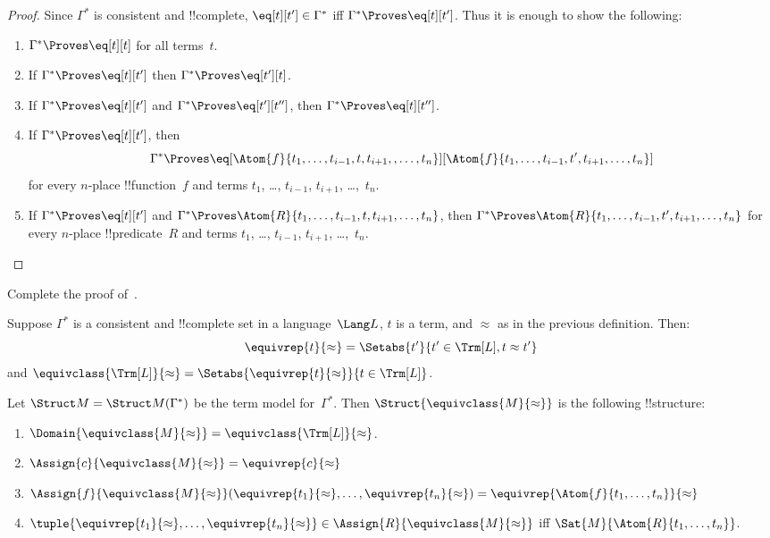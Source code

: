 \documentclass[../../../include/open-logic-section]{subfiles}
\begin{document}
\begin{proof}
Since $\Gamma^*$ is consistent and !!{complete}, $\eq[t][t'] \in
\Gamma^*$ iff $\Gamma^* \Proves \eq[t][t']$.  Thus it is enough to
show the following:
\begin{enumerate}
\item $\Gamma^* \Proves \eq[t][t]$ for all terms~$t$.
\item If $\Gamma^* \Proves \eq[t][t']$ then $\Gamma^* \Proves \eq[t'][t]$.
\item If $\Gamma^* \Proves \eq[t][t']$ and $\Gamma^* \Proves
  \eq[t'][t'']$, then $\Gamma^* \Proves \eq[t][t'']$.
\item If $\Gamma^* \Proves \eq[t][t']$, then
\[
\Gamma^* \Proves
\eq[\Atom{f}{t_1,\dots,t_{i-1},t,t_{i+1},,\dots,t_n}][\Atom{f}{t_1,\dots,t_{i-1},t',t_{i+1},\dots,t_n}]
\]
for every $n$-place !!{function}~$f$ and terms $t_1$, \dots,
$t_{i-1}$, $t_{i+1}$, \dots,~$t_n$.
\item If $\Gamma^* \Proves \eq[t][t']$ and
$\Gamma^* \Proves
\Atom{R}{t_1,\dots,t_{i-1},t,t_{i+1},\dots,t_n}$, then
$\Gamma^* \Proves \Atom{R}{t_1,\dots,t_{i-1},t',t_{i+1},\dots,t_n}$
for every $n$-place !!{predicate}~$R$ and terms $t_1$, \dots,
$t_{i-1}$, $t_{i+1}$, \dots,~$t_n$.
\end{enumerate}
\end{proof}

\begin{prob}
Complete the proof of~.
\end{prob}

\begin{defn}
Suppose $\Gamma^*$ is a consistent and !!{complete} set in a
language~$\Lang L$, $t$ is a term, and $\approx$ as in the previous
definition.  Then:
\[
\equivrep{t}{\approx} = \Setabs{t'}{t'\in \Trm[L], t \approx t'}
\]
and $\equivclass{\Trm[L]}{\approx} = \Setabs{\equivrep{t}{\approx}}{t \in \Trm[L]}$.
\end{defn}

\begin{defn}
Let $\Struct M = \Struct M(\Gamma^*)$ be the term model
for~$\Gamma^*$.  Then $\Struct{\equivclass{M}{\approx}}$ is the following
!!{structure}:
\begin{enumerate}
\item $\Domain{\equivclass{M}{\approx}} = \equivclass{\Trm[L]}{\approx}$.
\item $\Assign{c}{\equivclass{M}{\approx}} = \equivrep{c}{\approx}$
\item $\Assign{f}{\equivclass{M}{\approx}}(\equivrep{t_1}{\approx}, \dots,
  \equivrep{t_n}{\approx}) = \equivrep{\Atom{f}{t_1,\dots, t_n}}{\approx}$
\item $\tuple{\equivrep{t_1}{\approx}, \dots, \equivrep{t_n}{\approx}} \in
  \Assign{R}{\equivclass{M}{\approx}}$ iff $\Sat{M}{\Atom{R}{t_1,\dots, t_n}}$.
\end{enumerate}
\end{defn}
\end{document}
